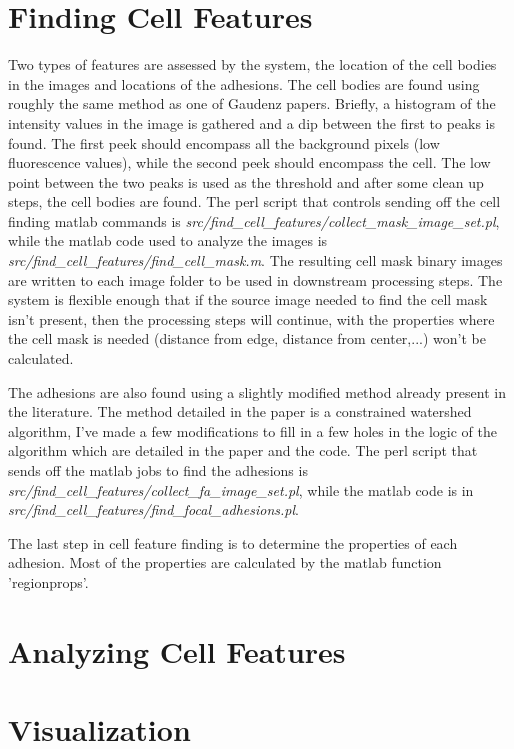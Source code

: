 \documentclass[letterpaper]{article}
\begin{document}
\section{Finding Cell Features}
	Two types of features are assessed by the system, the location of the cell
	bodies in the images and locations of the adhesions. The cell bodies are
	found using roughly the same method as one of Gaudenz papers\cite{Machacek06}.
	Briefly, a histogram of the intensity values in the image is gathered and a
	dip between the first to peaks is found. The first peek should encompass all
	the background pixels (low fluorescence values), while the second peek
	should encompass the cell. The low point between the two peaks is used as the
	threshold and after some clean up steps, the cell bodies are found. The perl
	script that controls sending off the cell finding matlab commands is
	\emph{src/find\_cell\_features/collect\_mask\_image\_set.pl}, while the
	matlab code used to analyze the images is
	\emph{src/find\_cell\_features/find\_cell\_mask.m}. The resulting cell mask
	binary images are written to each image folder to be used in downstream
	processing steps. The system is flexible enough that if the source image
	needed to find the cell mask isn't present, then the processing steps will
	continue, with the properties where the cell mask is needed (distance from edge,
	distance from center,...) won't be calculated.
	
	The adhesions are also found using a slightly modified method already
	present in the literature\cite{Zamir1999}. The method detailed in the paper
	is a constrained watershed algorithm, I've made a few modifications to fill
	in a few holes in the logic of the algorithm which are detailed in the paper
	and the code. The perl script that sends off the matlab jobs to find the
	adhesions is \emph{src/find\_cell\_features/collect\_fa\_image\_set.pl},
	while the matlab code is in
	\emph{src/find\_cell\_features/find\_focal\_adhesions.pl}.

	The last step in cell feature finding is to determine the properties of
	each adhesion. Most of the properties are calculated by the matlab function
	'regionprops'. 
	

\section{Analyzing Cell Features}

\section{Visualization}

{}

\end{document}
